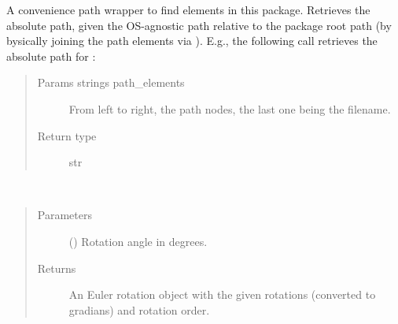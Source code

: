 \documentclass[letterpaper,10pt,english,openany,oneside]{sphinxmanual}
\begin{document}

\begin{fulllineitems}
\label{\detokenize{io_anim_mvnx:io_anim_mvnx.utils.resolve_path}}
A convenience path wrapper to find elements in this package. Retrieves
the absolute path, given the OS-agnostic path relative to the package
root path (by bysically joining the path elements via ).
E.g., the following call retrieves the absolute path for
:

\begin{sphinxVerbatim}[commandchars=\\\{\}]
  
\end{sphinxVerbatim}
\begin{quote}\begin{description}
\item[{Params strings path\_elements}] \leavevmode
From left to right, the path nodes,
the last one being the filename.

\item[{Return type}] \leavevmode
str

\end{description}\end{quote}

\end{fulllineitems}


\begin{fulllineitems}
\label{\detokenize{io_anim_mvnx:io_anim_mvnx.utils.rot_euler_degrees}}~\begin{quote}\begin{description}
\item[{Parameters}] \leavevmode
{} () \textendash{} Rotation angle in degrees.

\item[{Returns}] \leavevmode
An Euler rotation object with the given rotations (converted to
gradians) and rotation order.

\end{description}\end{quote}

\end{fulllineitems}
\end{document}
